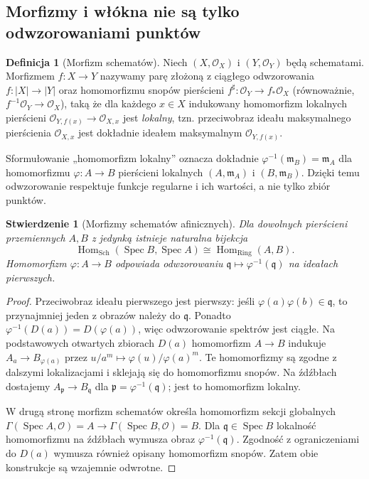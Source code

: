 \documentclass[11pt,a4paper,openany]{report}
\numberwithin{equation}{section}
\theoremstyle{plain}
\newtheorem{stwierdzenie}[twierdzenie]{Stwierdzenie}
\theoremstyle{definition}
\newtheorem{definicja}[twierdzenie]{Definicja}
\theoremstyle{remark}
\newcommand{\Spec}{\operatorname{Spec}}
\begin{document}
\subsection{Morfizmy i włókna nie są tylko odwzorowaniami punktów}

\begin{definicja}[Morfizm schematów]
\label{def:ga5-morfizm}
Niech $(X,\mathcal O_X)$ i $(Y,\mathcal O_Y)$ będą schematami.
Morfizmem $f:X\to Y$ nazywamy parę złożoną z ciągłego odwzorowania
$f:|X|\to|Y|$ oraz homomorfizmu snopów pierścieni
$f^\sharp:\mathcal O_Y\to f_*\mathcal O_X$ (równoważnie,
$f^{-1}\mathcal O_Y\to\mathcal O_X$), taką że dla każdego $x\in X$
indukowany homomorfizm lokalnych pierścieni
$\mathcal O_{Y,f(x)}\to\mathcal O_{X,x}$ jest \emph{lokalny}, tzn.
przeciwobraz ideału maksymalnego pierścienia $\mathcal O_{X,x}$
jest dokładnie ideałem maksymalnym $\mathcal O_{Y,f(x)}$.
\end{definicja}

Sformułowanie „homomorfizm lokalny” oznacza dokładnie
$\varphi^{-1}(\mathfrak m_B)=\mathfrak m_A$ dla homomorfizmu
$\varphi:A\to B$ pierścieni lokalnych $(A,\mathfrak m_A)$ i
$(B,\mathfrak m_B)$. Dzięki temu odwzorowanie respektuje funkcje
regularne i ich wartości, a nie tylko zbiór punktów.

\begin{stwierdzenie}[Morfizmy schematów afinicznych]
\label{st:ga5-affine-morphism}
Dla dowolnych pierścieni przemiennych $A,B$ z jedynką istnieje
naturalna bijekcja
\[
 \operatorname{Hom}_{\mathrm{Sch}}(\Spec B,\Spec A)
 \cong\operatorname{Hom}_{\mathrm{Ring}}(A,B).
\]
Homomorfizm $\varphi:A\to B$ odpowiada odwzorowaniu
$\mathfrak q\mapsto\varphi^{-1}(\mathfrak q)$ na ideałach pierwszych.
\end{stwierdzenie}
\begin{proof}
Przeciwobraz ideału pierwszego jest pierwszy: jeśli
$\varphi(a)\varphi(b)\in\mathfrak q$, to przynajmniej jeden
z obrazów należy do $\mathfrak q$. Ponadto
$\varphi^{-1}(D(a))=D(\varphi(a))$, więc odwzorowanie spektrów
jest ciągłe. Na podstawowych otwartych zbiorach $D(a)$
homomorfizm $A\to B$ indukuje
$A_a\to B_{\varphi(a)}$ przez $u/a^m\mapsto\varphi(u)/\varphi(a)^m$.
Te homomorfizmy są zgodne z dalszymi lokalizacjami i sklejają się
do homomorfizmu snopów. Na źdźbłach dostajemy
$A_{\mathfrak p}\to B_{\mathfrak q}$ dla
$\mathfrak p=\varphi^{-1}(\mathfrak q)$; jest to homomorfizm lokalny.

W drugą stronę morfizm schematów określa homomorfizm sekcji
globalnych $\Gamma(\Spec A,\mathcal O)=A\to
\Gamma(\Spec B,\mathcal O)=B$. Dla $\mathfrak q\in\Spec B$
lokalność homomorfizmu na źdźbłach wymusza obraz
$\varphi^{-1}(\mathfrak q)$. Zgodność z ograniczeniami do
$D(a)$ wymusza również opisany homomorfizm snopów.
Zatem obie konstrukcje są wzajemnie odwrotne.
\end{proof}
\end{document}
